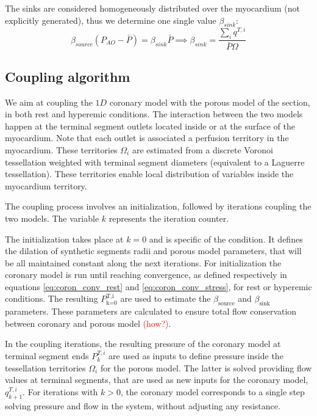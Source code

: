 \documentclass[journal]{IEEEtran}
\newcommand{\joinus}[2]{\ensuremath{#1_{\text{#2}}}}
\newcommand{\joinuss}[3]{\ensuremath{#1_{\text{#2}}^{\text{#3}}}}
\newcommand{\clcg}[1]{\textcolor{red}{#1}}
\begin{document}
The sinks are considered homogeneously distributed over the myocardium (not explicitly generated), thus we determine one single value $\beta_{sink}$:
\begin{equation}
\beta_{source} \left(P_{AO} - \bar{P}\right) = \beta_{sink} \bar{P} \implies
\beta_{sink} = \frac{\sum_{i} q^{T,i}}{\bar{P} \Omega}
\end{equation}
 
\subsection{Coupling algorithm}
We aim at coupling the $1D$ coronary model with the porous model of the section, in both rest and hyperemic conditions.
The interaction between the two models happen at the terminal segment outlets located inside or at the surface of the myocardium. Note that each outlet is associated a perfusion territory in the myocardium. These territories $\Omega_i$ are estimated from a discrete Voronoi tessellation \cite{Serra:235415} weighted with terminal segment diameters (equivalent to a Laguerre tessellation). These territories enable local distribution of variables inside the myocardium territory. 


The coupling process involves an initialization, followed by iterations coupling the two models. The variable $k$ represents the iteration counter. 

The initialization takes place at $k=0$ and is specific of the condition. It defines the dilation of synthetic segments radii and porous model parameters, that will be all maintained constant along the next iterations. For initialization the coronary model is run until reaching convergence, as defined respectively in equations \ref{eq:coron_conv_rest} and \ref{eq:coron_conv_stress}, for rest or hyperemic conditions. The resulting \joinuss{P}{k=0}{T,i} are used to estimate the \joinus{\beta}{source} and \joinus{\beta}{sink} parameters. These parameters are calculated to ensure total flow conservation between coronary and porous model \clcg{(how?)}. %


In the coupling iterations, the resulting pressure of the coronary model at terminal segment ends $P^{T,i}_k$ are used as inputs to define pressure inside the tessellation territories $\Omega_i$ for the porous model. The latter is solved providing flow values at terminal segments, that are used as new inputs for the coronary model, $q^{T,i}_{k+1}$. For iterations with $k > 0$, the coronary model corresponds to a single step solving pressure and flow in the system, without adjusting any resistance.
 
\end{document}

